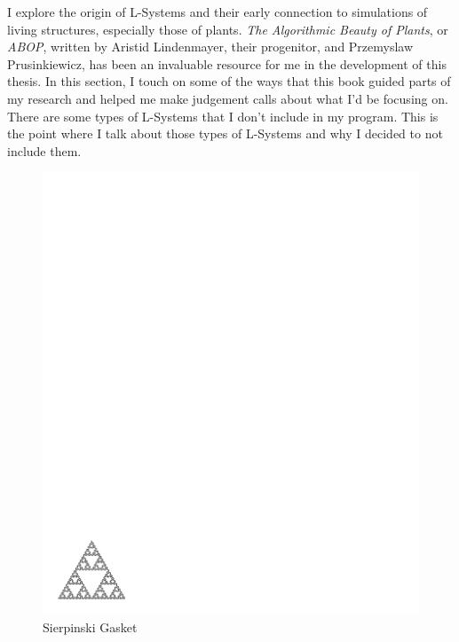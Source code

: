 \documentclass[12pt,twoside]{reedthesis}
\begin{document}
	I explore the origin of L-Systems and their early connection to simulations of living structures, especially those of plants. \textit{The Algorithmic Beauty of Plants}, or \textit{ABOP}, written by Aristid Lindenmayer, their progenitor, and Przemyslaw Prusinkiewicz, has been an invaluable resource for me in the development of this thesis. In this section, I touch on some of the ways that this book guided parts of my research and helped me make judgement calls about what I'd be focusing on. There are some types of L-Systems that I don't include in my program. This is the point where I talk about those types of L-Systems and why I decided to not include them.
	
	
	\begin{figure}[h]
	\centering
	\includegraphics[clip=true, viewport=0in 0.3in 2.5in 2in, scale=1.4]{Images/Sierpinski} %
	\caption[Sierpinski Gasket]{Sierpinski Gasket\footnotemark}
	\label {Sierpinski}
	\end{figure}
	
\end{document}
